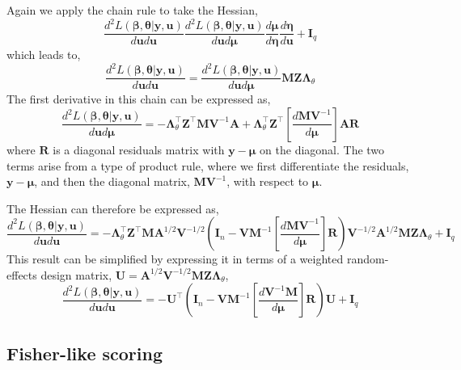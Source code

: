 \documentclass{jss}
\begin{document}
Again we apply the chain rule to take the Hessian,
\begin{equation}
\frac{d^2 L(\bm\beta, \bm\theta | \bm y, \bm u)}{d \bm u d \bm u}
\frac{d^2 L(\bm\beta, \bm\theta | \bm y, \bm u)}{d \bm u d \bm\mu}
\frac{d \bm\mu}{d \bm\eta}
\frac{d \bm\eta}{d \bm u} + \bm I_q
\end{equation}
which leads to,
\begin{equation}
\frac{d^2 L(\bm\beta, \bm\theta | \bm y, \bm u)}{d \bm u d \bm u} = 
\frac{d^2 L(\bm\beta, \bm\theta | \bm y, \bm u)}{d \bm u d \bm\mu}\bm M \bm Z \bm\Lambda_\theta
\end{equation}
The first derivative in this chain can be expressed as,
\begin{equation}
\frac{d^2 L(\bm\beta, \bm\theta | \bm y, \bm u)}{d \bm u d \bm\mu} =
-\bm\Lambda_\theta^\top \bm Z^\top \bm M \bm V^{-1} \bm A  + 
\bm\Lambda_\theta^\top \bm Z^\top \left[ \frac{d \bm M \bm V^{-1}}{d \bm\mu} \right] \bm A \bm R
\end{equation}
where $\bm R$ is a diagonal residuals matrix with $\bm y-\bm\mu$ on the
diagonal. The two terms arise from a type of product rule, where we
first differentiate the residuals, $\bm y-\bm\mu$, and then the diagonal
matrix, $\bm M \bm V^{-1}$, with respect to $\bm\mu$.

The Hessian can therefore be expressed as,
\begin{equation}
\frac{d^2 L(\bm\beta, \bm\theta | \bm y, \bm u)}{d \bm u d \bm u} = 
-\bm \Lambda_\theta^\top \bm Z^\top \bm M \bm A^{1/2}\bm V^{-1/2}\left( 
\bm I_n - 
\bm V \bm M^{-1}\left[ \frac{d \bm M \bm V^{-1}}{d \bm\mu} \right] \bm R
\right) \bm V^{-1/2}\bm A^{1/2} \bm M \bm Z \bm\Lambda_\theta + \bm I_q
\label{eq:betaHessian}
\end{equation}
This result can be simplified by expressing it in terms of a weighted
random-effects design matrix, $\bm U = \bm A^{1/2}\bm V^{-1/2}\bm M \bm Z \bm\Lambda_\theta$,
\begin{equation}
\frac{d^2 L(\bm\beta, \bm\theta | \bm y, \bm u)}{d \bm u d \bm u} = 
-\bm U^\top\left( 
\bm I_n - 
\bm V \bm M^{-1}\left[ \frac{d \bm V^{-1}\bm M}{d \bm\mu} \right] \bm R
\right) \bm U + \bm I_q
\label{eq:betaHessian}
\end{equation}

\subsection{Fisher-like scoring}
\end{document}

